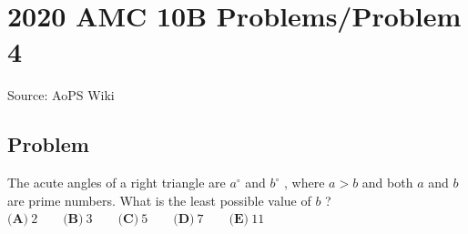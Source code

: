 \documentclass[12pt]{article}
\begin{document}
\section*{{2020 AMC 10B Problems/Problem 4}}
Source: AoPS Wiki

\subsection*{Problem}
The acute angles of a right triangle are $a^{\circ}$ and $b^{\circ}$ , where $a>b$ and both $a$ and $b$ are prime numbers. What is the least possible value of $b$ ? $\textbf{(A)}\ 2 \qquad\textbf{(B)}\ 3 \qquad\textbf{(C)}\ 5 \qquad\textbf{(D)}\ 7 \qquad\textbf{(E)}\ 11$
\end{document}

